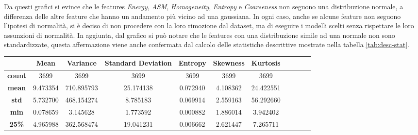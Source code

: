 Da questi grafici si evince che le features \textit{Energy}, \textit{ASM},
\textit{Homogeneity}, \textit{Entropy} e \textit{Coarseness} non seguono una
distribuzione normale, a differenza delle altre feature che hanno un andamento
più vicino ad una gaussiana. In ogni caso, anche se alcune feature non seguono
l'ipotesi di normalità, si è deciso di non procedere con la loro rimozione dal
dataset, ma di eseguire i modelli scelti senza rispettare le loro assunzioni di 
normalità.
In aggiunta, dal grafico si può notare che le features con una
distribuzione simile ad una normale non sono standardizzate, questa affermazione
viene anche confermata dal calcolo delle statistiche descrittive mostrate nella
tabella \ref{tab:desc-stat}.
\newpage
\begin{table}[!ht]
      \begin{subtable}[h]{1\textwidth}
            \centering
            \begin{tabular}{c|c c c c c c c c c c}
                  \hline
                  \rowcolor[HTML]{EFEFEF} \cellcolor[HTML]{EFEFEF}\textbf{} & \textbf{Mean} & \textbf{Variance} & \textbf{Standard Deviation} & \cellcolor[HTML]{EFEFEF}\textbf{Entropy} & \textbf{Skewness} & \textbf{Kurtosis} \\ \hline
                  \textbf{count}                                            & 3699          & 3699              & 3699                        & 3699                                     & 3699              & 3699              \\
                  \textbf{mean}                                             & 9.473354      & 710.895793        & 25.174138                   & 0.072940                                 & 4.108362          & 24.422551         \\
                  \textbf{std}                                              & 5.732700      & 468.154274        & 8.785183                    & 0.069914                                 & 2.559163          & 56.292660         \\
                  \textbf{min}                                              & 0.078659      & 3.145628          & 1.773592                    & 0.000882                                 & 1.886014          & 3.942402          \\
                  \textbf{25\%}                                             & 4.965988      & 362.568474        & 19.041231                   & 0.006662                                 & 2.621447          & 7.265711          \\

\end{tabular}
\end{subtable}
\end{table}
